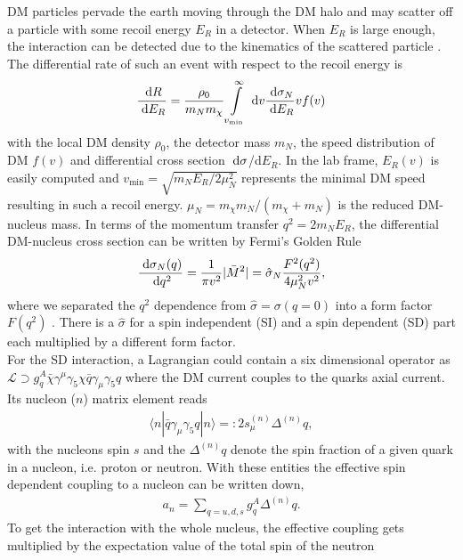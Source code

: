DM particles pervade the earth moving through the DM halo and may scatter off a particle 
with some recoil energy $E_R$ in a detector. When $E_R$ is large enough, the interaction can be detected due to
the kinematics of the scattered particle \cite{GoodmanWitten}. The differential rate of such an event with respect to the recoil energy is
\cite{1002.1912}
\begin{align}
 \frac{\; \mathrm{d} R}{\; \mathrm{d} E_R} = \frac{\rho_0}{m_N m_\chi}\int\limits_{v_\text{min}}^\infty \; \mathrm{d} v \frac{\; \mathrm{d} \sigma_N}{\; \mathrm{d} E_R} v f(v)
\end{align}
with the local DM density $\rho_0$, the detector mass $m_N$, the speed distribution of DM $f(v)$ \cite{1312.0273} and differential cross section $\; \mathrm{d}\sigma$/d$E_R$.
In the lab frame, $E_R(v)$ is easily computed and $v_\text{min} =\sqrt{m_NE_R/2\mu^2_N}$ represents the minimal DM speed resulting in such a recoil 
energy. $\mu_N = m_\chi m_N /(m_\chi+m_N)$ is the reduced DM-nucleus mass. In terms of the momentum transfer $q^2=2m_NE_R$, the differential
DM-nucleus cross section can be written by Fermi's Golden Rule 
\begin{align}
 \frac{\; \mathrm{d} \sigma_N(q)}{\; \mathrm{d} q^2} = \frac{1}{\pi v^2} |\bar{M}^2| = \hat{\sigma}_N \frac{F^2(q^2)}{4\mu_N^2 v^2},
\end{align}
where we separated the $q^2$ dependence from $\hat{\sigma} = \sigma(q=0)$ into a form factor $F(q^2)$ \cite{0608035}. There is a 
$\hat{\sigma}$ for a spin independent (SI) and a spin dependent (SD) part each multiplied by a different form factor. \\
\noindent For the SD interaction,
a Lagrangian could contain a six dimensional operator as $\mathcal{L} \supset g_q^A\bar \chi \gamma^\mu\gamma_5 \chi \bar q \gamma_\mu\gamma_5 q$
where the DM current couples to the quarks axial current. Its nucleon ($n$) matrix element reads
\begin{align}
 \langle n |\bar q \gamma_\mu \gamma_5 q|n\rangle =: 2 s_\mu^{(n)} \Delta^{(n)} q,
\end{align}
with the nucleons spin $s$ and the $\Delta^{(n)}q$ denote the spin fraction of a given quark in a nucleon, i.e. proton or neutron. With these entities
the effective spin dependent coupling to a nucleon can be written down,
\begin{align}
 a_n = \sum\limits_{q=u,d,s}  g_q^A \Delta^{(n)}q.
\end{align}
To get the interaction with the whole nucleus, the effective coupling gets multiplied by the expectation value of the total spin of the neutron
